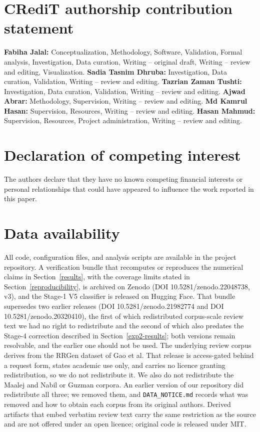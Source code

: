 \documentclass[preprint,12pt]{elsarticle}
\begin{document}
\section*{CRediT authorship contribution statement}
\textbf{Fabiha Jalal:} Conceptualization, Methodology, Software, Validation, Formal analysis,
Investigation, Data curation, Writing -- original draft, Writing -- review and editing,
Visualization. \textbf{Sadia Tasnim Dhruba:} Investigation, Data curation, Validation, Writing
-- review and editing. \textbf{Tazrian Zaman Tushti:} Investigation, Data curation, Validation,
Writing -- review and editing. \textbf{Ajwad Abrar:} Methodology, Supervision, Writing --
review and editing. \textbf{Md Kamrul Hasan:} Supervision, Resources, Writing -- review and
editing. \textbf{Hasan Mahmud:} Supervision, Resources, Project administration, Writing --
review and editing.

\section*{Declaration of competing interest}
The authors declare that they have no known competing financial interests or personal
relationships that could have appeared to influence the work reported in this paper.

\section*{Data availability}
All code, configuration files, and analysis scripts are available in the project repository.
A verification bundle that recomputes or reproduces the numerical claims in
Section~\ref{results}, with the coverage limits stated in Section~\ref{reproducibility}, is archived on Zenodo
(DOI 10.5281/zenodo.22048738, v3), and the Stage-1 V5 classifier is released on Hugging Face.
That bundle supersedes two earlier releases (DOI 10.5281/zenodo.21982774 and DOI 10.5281/zenodo.20320410), the first of which redistributed corpus-scale review text we had no right to redistribute and the second of which also predates the
Stage-4 correction described in Section~\ref{exp2-results}; both versions remain resolvable, and
the earlier one should not be used.
The underlying review corpus derives from the RRGen dataset of Gao et al. That release is
access-gated behind a request form, states academic use only, and carries no licence granting
redistribution, so we do not redistribute it. We also do not redistribute the Maalej and Nabil or
Guzman corpora. An earlier version of our repository did redistribute all three; we removed them,
and \texttt{DATA\_NOTICE.md} records what was removed and how to obtain each corpus from its
original authors. Derived artifacts that embed verbatim review text carry the same restriction as
the source and are not offered under an open licence; original code is released under MIT.
\end{document}
